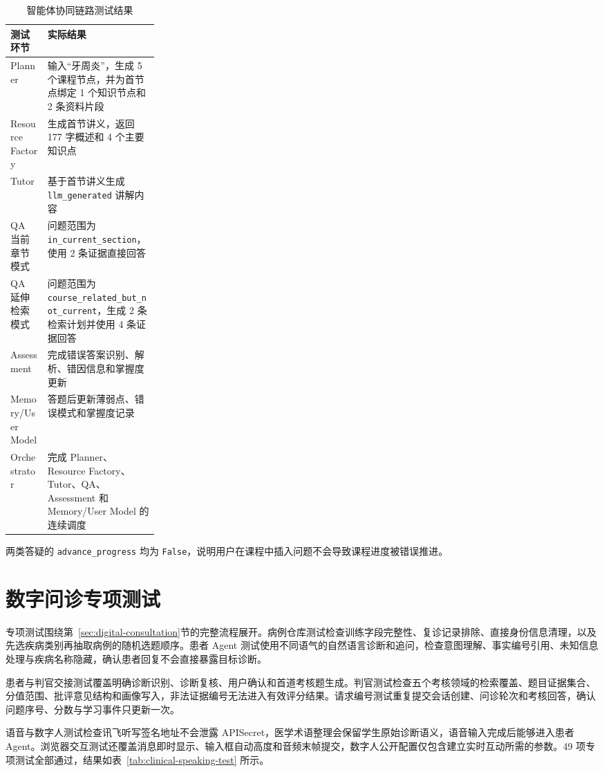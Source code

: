 \begin{table}[H]
  \centering
  \caption{智能体协同链路测试结果}
  \label{tab:agent-chain-test}
  \begin{tabularx}{\linewidth}{p{0.25\linewidth}X}
    \toprule
    测试环节 & 实际结果 \\
    \midrule
    Planner & 输入“牙周炎”，生成 5 个课程节点，并为首节点绑定 1 个知识节点和 2 条资料片段 \\
    Resource Factory & 生成首节讲义，返回 177 字概述和 4 个主要知识点 \\
    Tutor & 基于首节讲义生成 \texttt{llm\_generated} 讲解内容 \\
    QA 当前章节模式 & 问题范围为 \texttt{in\_current\_section}，使用 2 条证据直接回答 \\
    QA 延伸检索模式 & 问题范围为 \texttt{course\_related\_but\_not\_current}，生成 2 条检索计划并使用 4 条证据回答 \\
    Assessment & 完成错误答案识别、解析、错因信息和掌握度更新 \\
    Memory/User Model & 答题后更新薄弱点、错误模式和掌握度记录 \\
    Orchestrator & 完成 Planner、Resource Factory、Tutor、QA、Assessment 和 Memory/User Model 的连续调度 \\
    \bottomrule
  \end{tabularx}
\end{table}

两类答疑的 \texttt{advance\_progress} 均为 \texttt{False}，说明用户在课程中插入问题不会导致课程进度被错误推进。

\section{数字问诊专项测试}

专项测试围绕第~\ref{sec:digital-consultation}节的完整流程展开。病例仓库测试检查训练字段完整性、复诊记录排除、直接身份信息清理，以及先选疾病类别再抽取病例的随机选题顺序。患者 Agent 测试使用不同语气的自然语言诊断和追问，检查意图理解、事实编号引用、未知信息处理与疾病名称隐藏，确认患者回复不会直接暴露目标诊断。

患者与判官交接测试覆盖明确诊断识别、诊断复核、用户确认和首道考核题生成。判官测试检查五个考核领域的检索覆盖、题目证据集合、分值范围、批评意见结构和画像写入，非法证据编号无法进入有效评分结果。请求编号测试重复提交会话创建、问诊轮次和考核回答，确认问题序号、分数与学习事件只更新一次。

语音与数字人测试检查讯飞听写签名地址不会泄露 APISecret，医学术语整理会保留学生原始诊断语义，语音输入完成后能够进入患者 Agent。浏览器交互测试还覆盖消息即时显示、输入框自动高度和音频末帧提交，数字人公开配置仅包含建立实时互动所需的参数。49 项专项测试全部通过，结果如表~\ref{tab:clinical-speaking-test} 所示。

